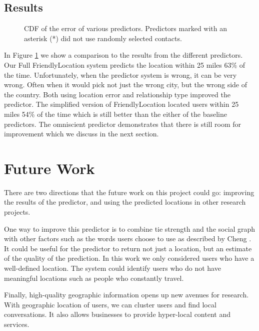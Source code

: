 \documentclass{sig-alternate}
\begin{document}
\subsection{Results}
\begin{figure}
\centering
{}
\caption{
CDF of the error of various predictors. Predictors marked with an asterisk (*)
did not use randomly selected contacts.
}
\label{fig:FinalResults}
\end{figure}

In Figure \ref{fig:FinalResults} we show a comparison to the results from the 
different predictors.
Our Full FriendlyLocation system predicts the location within 25 miles 63\% of
the time.
Unfortunately, when the predictor system is wrong, it can be very wrong.
Often when it would pick not just the wrong city, but the wrong side of the
country.
Both using location error and relationship type improved the predictor.  The
simplified version of FriendlyLocation located users within 25 miles 54\% of
the time which is still better than the either of the baseline predictors.
The omniscient predictor demonstrates that there is still room for improvement
which we discuss in the next section.

\section{Future Work}
There are two directions that the future work on this project could go:
improving the results of the predictor, and using the predicted locations in
other research projects.

One way to improve this predictor is to combine tie strength and the social
graph with other factors such as the words users choose to use as described by
Cheng \cite{cheng2010you}.
It could be useful for the predictor to return not just a location, but an
estimate of the quality of the prediction.  In this work we only considered
users who have a well-defined location. The system could identify users
who do not have meaningful locations such as people who constantly travel.

Finally, high-quality geographic information opens up new avenues for research.
With geographic location of users, we can cluster users and find local conversations.
It also allows businesses to provide hyper-local content and services.

 
\end{document}
